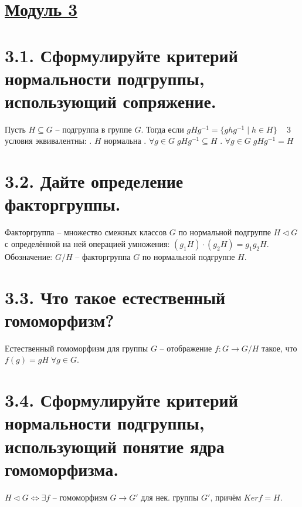 \documentclass{article}
\begin{document}
\newpage
{}
\section*{\LARGE\centering \underline{Модуль 3}}

\section*{\LARGE 3.1. Сформулируйте критерий нормальности подгруппы, использующий сопряжение.}
Пусть $H \subseteq G$ -- подгруппа в группе $G$. Тогда если $gHg^{-1} = \{ghg^{-1}\;|\;h\in H\}\;\;\;$ 3 условия эквивалентны:
\newline {}. $H$ нормальна
\newline {}. $\forall g \in G \; gHg^{-1} \subseteq H $
\newline {}. $\forall g \in G \; gHg^{-1} = H $

\section*{\LARGE 3.2. Дайте определение факторгруппы.}
Факторгруппа -- множество смежных классов $G$ по нормальной подгруппе $H\triangleleft G$ с определённой на ней операцией умножения: $(g_1H)\cdot(g_2H) = g_1g_2H$. \newline Обозначение: $G/H$ -- факторгруппа $G$ по нормальной подгруппе $H$.

\section*{\LARGE 3.3. Что такое естественный гомоморфизм?}
Естественный гомоморфизм для группы $G$ -- отображение $f : G \rightarrow G/H$ такое, что $f(g) = gH \; \forall g \in G$.

\section*{\LARGE 3.4. Сформулируйте критерий нормальности подгруппы, использующий понятие ядра гомоморфизма.}
$H\triangleleft G \Leftrightarrow \exists f \mbox{ -- гомоморфизм } G \rightarrow G' \mbox{ для нек. группы } G',\, \mbox{причём } Kerf = H$. 
\end{document}
